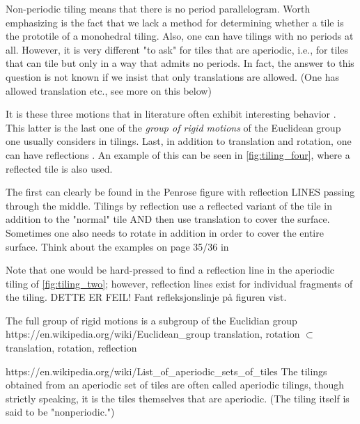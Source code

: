 


Non-periodic tiling means that there is no period parallelogram.  
Worth emphasizing is the fact that we lack a method for determining whether a tile is the prototile of a monohedral tiling. 
Also, one can have tilings with no periods at all. However, it is very different "to ask" for tiles that are aperiodic, i.e., 
for tiles that can tile but only in a way that admits no periods. In fact, the answer to this question is not known if we insist that only 
translations are allowed. (One has allowed translation etc., see more on this below)



It is these three motions that in literature often exhibit interesting behavior \cite{kolountzakisTilingsTranslation2010}. 
This latter is the last one of the \emph{group of rigid motions} of the Euclidean group one usually considers in tilings. %
Last, in addition to translation and rotation, one can have reflections \cite{kolountzakisTilingsTranslation2010}. 
An example of this can be seen in \cref{fig:tiling_four}, where a reflected tile is also used.

The first can clearly be found in the Penrose figure with reflection LINES passing through the middle. 
Tilings by reflection use a reflected variant of the tile in addition to the "normal" tile AND then use translation to cover the surface. 
Sometimes one also needs to rotate in addition in order to cover the entire surface. 
Think about the examples on page 35/36 in \cite{grunbaumTilingsPatterns1987}


Note that one would be hard-pressed to find a reflection line in the aperiodic tiling of \cref{fig:tiling_two}; however, reflection lines exist for 
individual fragments of the tiling. DETTE ER FEIL! Fant refleksjonslinje på figuren vist.

The full group of rigid motions is a subgroup of the Euclidian group https://en.wikipedia.org/wiki/Euclidean_group
translation, rotation $\subset$ translation, rotation, reflection

https://en.wikipedia.org/wiki/List_of_aperiodic_sets_of_tiles
The tilings obtained from an aperiodic set of tiles are often called aperiodic tilings, though strictly speaking, it is the tiles themselves 
that are aperiodic. (The tiling itself is said to be "nonperiodic.")